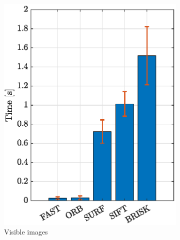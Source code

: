 \begin{figure}[!h]
     \centering
     \begin{subfigure}[b]{0.46\textwidth}
         \centering
         \includegraphics[width=\textwidth]{Images/VISTimesDetect.eps}
         \caption{Visible images}
         \label{fig:detectvis}
     \end{subfigure}
     \hfill
     \begin{subfigure}[b]{0.46\textwidth}
         \centering

\end{subfigure}
\end{figure}
